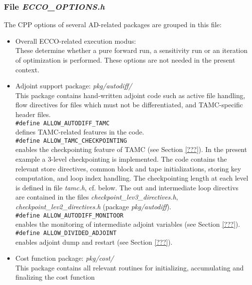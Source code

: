 \subsubsection{File {\it ECCO\_OPTIONS.h}}

The CPP options of several AD-related packages are grouped
in this file:
%
\begin{itemize}
%
\item 
Overall ECCO-related execution modus: \\
These determine whether a pure forward run,
a sensitivity run or an iteration of optimization is
performed. These options are not needed in the present context.
%
\item 
Adjoint support package: {\it pkg/autodiff/} \\
This package contains hand-written adjoint code such as
active file handling, flow directives for files which must not
be differentiated, and TAMC-specific header files. \\
%
\hspace*{4ex} {\tt \#define ALLOW\_AUTODIFF\_TAMC} \\
defines TAMC-related features in the code. \\
%
\hspace*{4ex} {\tt \#define ALLOW\_TAMC\_CHECKPOINTING} \\
enables the checkpointing feature of TAMC
(see Section \ref{???}).
In the present example a 3-level checkpointing is implemented.
The code contains the relevant store directives, common block
and tape initializations, storing key computation,
and loop index handling.
The checkpointing length at each level is defined in
file {\it tamc.h}, cf. below.
The out and intermediate loop directivs are contained
in the files {\it checkpoint\_lev3\_directives.h}, 
{\it checkpoint\_lev2\_directives.h} (package {\it pkg/autodiff}). \\
%
\hspace*{4ex} {\tt \#define ALLOW\_AUTODIFF\_MONITOOR} \\
enables the monitoring of intermediate adjoint variables
(see Section \ref{???}). \\
%
\hspace*{4ex} {\tt \#define ALLOW\_DIVIDED\_ADJOINT} \\
enables adjoint dump and restart
(see Section \ref{???}).
%
\item Cost function package: {\it pkg/cost/} \\
This package contains all relevant routines for
initializing, accumulating and finalizing the cost function

\end{itemize}
